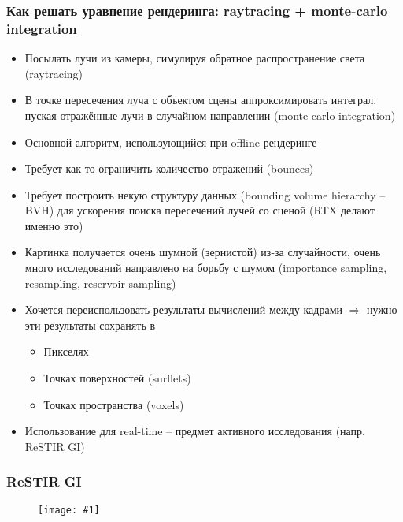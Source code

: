 \documentclass{beamer}
\newcommand{\slideimage}[1]{
  \begin{figure}
    \begin{adjustbox}{width=\textwidth, totalheight=\textheight-2\baselineskip-2\baselineskip,keepaspectratio}
      \texttt{[image: \#1]}
    \end{adjustbox}
  \end{figure}
}
\begin{document}
\begin{frame}[fragile]
\frametitle{Как решать уравнение рендеринга: raytracing + monte-carlo integration}
\fontsize{8pt}{8pt}
\begin{itemize}
\item Посылать лучи из камеры, симулируя обратное распространение света (raytracing)
\item В точке пересечения луча с объектом сцены аппроксимировать интеграл, пуская отражённые лучи в случайном направлении (monte-carlo integration)
\pause
\item Основной алгоритм, использующийся при offline рендеринге
\pause
\item Требует как-то ограничить количество отражений (bounces)
\pause
\item Требует построить некую структуру данных (bounding volume hierarchy -- BVH) для ускорения поиска пересечений лучей со сценой (RTX делают именно это)
\pause
\item Картинка получается очень шумной (зернистой) из-за случайности, очень много исследований направлено на борьбу с шумом (importance sampling, resampling, reservoir sampling)
\pause
\item Хочется переиспользовать результаты вычислений между кадрами \begin{math}\Rightarrow\end{math} нужно эти результаты сохранять в
\begin{itemize}
\item Пикселях
\item Точках поверхностей (surflets)
\item Точках пространства (voxels)
\end{itemize}
\pause
\item Использование для real-time -- предмет активного исследования (напр. ReSTIR GI)
\end{itemize}
\end{frame}

\begin{frame}[fragile]
\frametitle{ReSTIR GI}
\slideimage{restir.png}
\end{frame}
\end{document}
